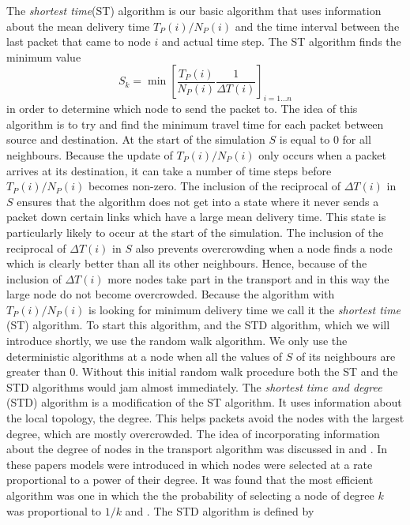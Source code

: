 \documentclass[runningheads]{llncs}
\begin{document}
The \emph{shortest time}(ST) algorithm is our basic algorithm that
uses information about the mean delivery time $T_P(i)/ N_P(i)$ and
the time interval between the last packet that came to node $i$ and
actual time step. The ST algorithm finds the minimum value
\begin{equation}\label{ST}
  S_k=\min\left[\frac{T_P(i)}{N_P(i)}\frac{1}{\Delta
  T(i)}\right]_{i=1\ldots n}
\end{equation}
in order to determine which node to send the packet to. The idea of
this algorithm is to try and find the minimum travel time for each
packet between source and destination. At the start of the
simulation $S$ is equal to $0$ for all neighbours.  Because the
update of $T_P(i)/ N_P(i)$ only occurs when a packet arrives at its
destination, it can take a number of time steps before $T_P(i)/
N_P(i)$ becomes non-zero. The inclusion of the reciprocal of $\Delta
T(i)$ in $S$ ensures that the algorithm does not get into a state
where it never sends a packet down certain links which have a large
mean delivery time. This state is particularly likely to occur at
the start of the simulation. The inclusion of the reciprocal of
$\Delta T(i)$ in $S$ also prevents overcrowding when a node finds a
node which is clearly better than all its other neighbours. Hence,
because of the inclusion of $\Delta T(i)$ more nodes take part in
the transport and in this way the large node do not become
overcrowded. Because the algorithm with $T_P(i)/ N_P(i)$ is looking
for minimum delivery time we call it the \emph{shortest time} (ST)
algorithm. To start this algorithm, and the STD algorithm, which we
will introduce shortly, we use the random walk algorithm. We only
use the deterministic algorithms at a node when all the values of
$S$ of its neighbours are greater than 0. Without this initial
random walk procedure both the ST and the STD algorithms would jam
almost immediately. The \emph{shortest time and degree} (STD)
algorithm is a modification of the ST algorithm. It uses information
about the local topology, the degree. This helps packets avoid the
nodes with the largest degree, which are mostly overcrowded. The
idea of incorporating information about the degree of nodes in the
transport algorithm was discussed in \cite{Yan} and \cite{Wang}. In
these papers models were introduced in which nodes were selected at
a rate proportional to a power of their degree. It was found that
the most efficient algorithm was one in which the the probability of
selecting a node of degree $k$ was proportional to  $1/k$ \cite{Yan}
and \cite{Wang}. The STD algorithm is defined by
\end{document}

